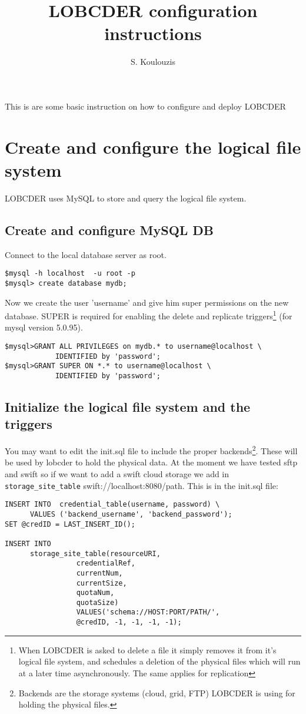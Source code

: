 \documentclass[a4paper,10pt]{article}
\title{LOBCDER configuration instructions}
\author{S. Koulouzis}
\date{}
\begin{document}
\maketitle
This is are some basic instruction on how to configure and deploy LOBCDER 

\section{Create and configure the logical file system}
LOBCDER uses MySQL to store and query the logical file system.

\subsection{Create and configure MySQL DB}
Connect to the local database server as root.

\begin{lstlisting}
$mysql -h localhost  -u root -p
$mysql> create database mydb;
\end{lstlisting}


Now we create the user 'username' and give him super permissions on the new database. SUPER is required for 
enabling the delete and replicate triggers\footnote{When LOBCDER is asked to delete a file it simply removes it 
from it's logical file system, and schedules a deletion of the physical files which will run at a later time 
asynchronously. The same applies for replication} (for mysql version 5.0.95). 
\begin{lstlisting}
$mysql>GRANT ALL PRIVILEGES on mydb.* to username@localhost \ 
			IDENTIFIED by 'password';
$mysql>GRANT SUPER ON *.* to username@localhost \
			IDENTIFIED by 'password';
\end{lstlisting}


\subsection{Initialize the logical file system and the triggers}
You may want to edit the init.sql file to include the proper backends\footnote{Backends are the storage systems 
(cloud, grid, FTP) LOBCDER is using for holding the physical files.}. 
These will be used by lobcder to hold the physical data. At the moment we have tested sftp and swift so if we want 
to add a swift cloud storage we add in \texttt{storage\_site\_table} swift://localhost:8080/path. This is in the 
init.sql file: 

\begin{lstlisting}
INSERT INTO  credential_table(username, password) \
	  VALUES ('backend_username', 'backend_password');
SET @credID = LAST_INSERT_ID();

INSERT INTO 
	  storage_site_table(resourceURI, 
			     credentialRef, 
			     currentNum, 
			     currentSize, 
			     quotaNum, 
			     quotaSize)
			     VALUES('schema://HOST:PORT/PATH/', 
			     @credID, -1, -1, -1, -1);
\end{lstlisting}
\end{document}
